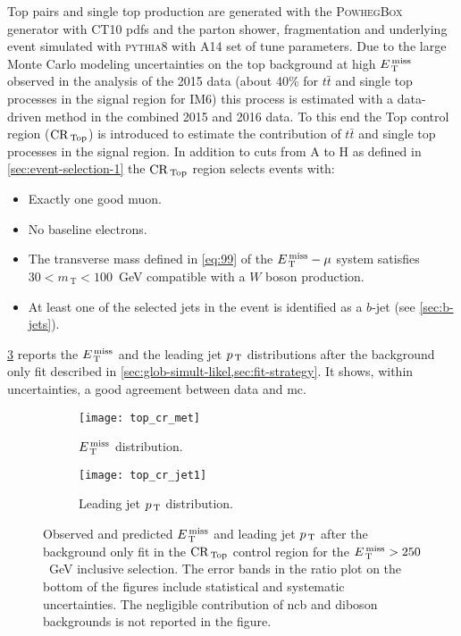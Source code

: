 Top pairs and single top production are generated with the
\textsc{PowhegBox}~\cite{POWHEG} generator with CT10 \glspl{pdf} and the parton
shower, fragmentation and underlying event simulated with \textsc{pythia8} with
A14 set of tune parameters. Due to the large Monte Carlo modeling uncertainties
on the top background at high $E_\mathrm{\, T}^\mathrm{\, miss}$ observed in the analysis of the 2015 data
(about 40\% for $t \bar{t}$ and single top processes in the signal region for
IM6) this process is estimated with a data-driven method in the combined 2015
and 2016 data. To this end the Top control region ($\mathrm{CR}_\mathrm{\, Top}$) is introduced to
estimate the contribution of $t \bar{t}$ and single top processes in the signal
region. In addition to cuts from A to H as defined in
\cref{sec:event-selection-1} the $\mathrm{CR}_\mathrm{\, Top}$ region selects events with:
\begin{itemize}
\item Exactly one good muon.
\item No baseline electrons.
\item The transverse mass defined in \eqref{eq:99} of the $E_\mathrm{\, T}^\mathrm{\, miss} - \mu$ system
  satisfies $30 < m_\mathrm{\, T} < 100$~GeV compatible with a $W$ boson
  production.
\item At least one of the selected jets in the event is identified as a $b$-jet
  (see \cref{sec:b-jets}).
\end{itemize}
\cref{fig:top_plots} reports the $E_\mathrm{\, T}^\mathrm{\, miss}$ and the leading jet $p_\mathrm{\, T}$ distributions
after the background only fit described in
\cref{sec:glob-simult-likel,sec:fit-strategy}. It shows, within uncertainties, a
good agreement between data and \gls{mc}.
\begin{figure}[!h]
  \centering
  \begin{subfigure}[t]{.48\linewidth}
    \texttt{[image: top\_cr\_met]}
    \caption{$E_\mathrm{\, T}^\mathrm{\, miss}$ distribution.}
    \label{fig:top_cr_et_miss}
  \end{subfigure}
  \begin{subfigure}[t]{.48\linewidth}
    \texttt{[image: top\_cr\_jet1]}
    \caption{Leading jet $p_\mathrm{\, T}$ distribution.}
    \label{fig:top_cr_jet1}
  \end{subfigure}
  \caption{Observed and predicted $E_\mathrm{\, T}^\mathrm{\, miss}$ and leading jet $p_\mathrm{\, T}$ after the
    background only fit in the $\mathrm{CR}_\mathrm{\, Top}$ control region for the $E_\mathrm{\, T}^\mathrm{\, miss} > 250$~GeV
    inclusive selection. The error bands in the ratio plot on the bottom of the
    figures include statistical and systematic uncertainties. The negligible
    contribution of \gls{ncb} and diboson backgrounds is not reported in the
    figure.}
  \label{fig:top_plots}
\end{figure}
